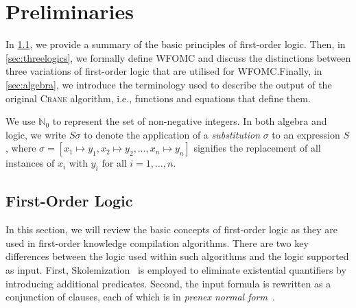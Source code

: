 \documentclass{article}
\theoremstyle{remark}
\begin{document}
\section{Preliminaries}

In \cref{sec:logic}, we provide a summary of the basic principles of first-order
logic. Then, in \cref{sec:threelogics}, we formally define WFOMC and discuss the
distinctions between three variations of first-order logic that are utilised for
WFOMC.\@ Finally, in \cref{sec:algebra}, we introduce the terminology used to
describe the output of the original \textsc{Crane} algorithm, i.e., functions
and equations that define them.

We use $\mathbb{N}_{0}$ to represent the set of non-negative integers. In both
algebra and logic, we write $S\sigma$ to denote the application of a
\emph{substitution} $\sigma$ to an expression $S$, where
$\sigma = [x_{1} \mapsto y_{1}, x_{2} \mapsto y_{2}, \dots, x_{n} \mapsto y_{n}]$
signifies the replacement of all instances of $x_{i}$ with $y_{i}$ for all
$i = 1, \dots, n$.

\subsection{First-Order Logic}\label{sec:logic}

In this section, we will review the basic concepts of first-order logic as they
are used in first-order knowledge compilation algorithms. There are two key
differences between the logic used within such algorithms and the logic
supported as input. First, Skolemization~\cite{DBLP:conf/kr/BroeckMD14} is
employed to eliminate existential quantifiers by introducing additional
predicates. Second, the input formula is rewritten as a conjunction of clauses,
each of which is in \emph{prenex normal form}~\cite{hinman2018fundamentals}.
\end{document}
